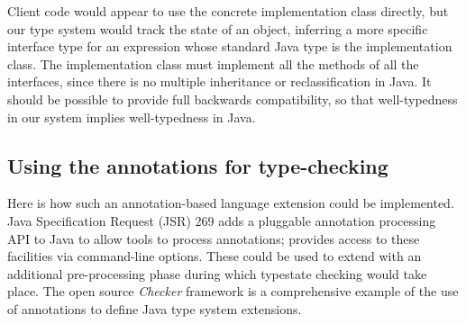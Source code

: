 Client code would appear to use the concrete implementation class
directly, but our type system would track the state of an object,
inferring a more specific interface type for an expression whose
standard Java type is the implementation class. The implementation
class must implement all the methods of all the interfaces, since
there is no multiple inheritance or reclassification in Java. It
should be possible to provide full backwards compatibility, so that
well-typedness in our system implies well-typedness in Java.

\subsection{Using the annotations for type-checking}

Here is how such an annotation-based language extension could be
implemented. Java Specification Request (JSR) 269 \cite{jsr269} adds a
pluggable annotation processing API to Java to allow tools to process
annotations;  provides access to these facilities via
command-line options. These could be used to extend  with
an additional pre-processing phase during which typestate checking
would take place. The open source \emph{Checker} framework
\cite{papi08,dietl11} is a comprehensive example of the use of
annotations to define Java type system extensions.
